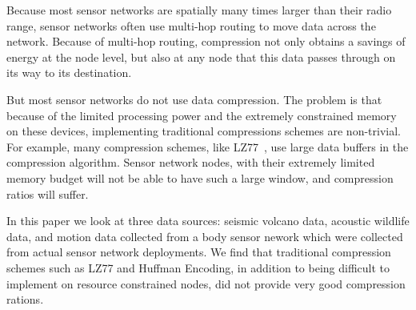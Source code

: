 Because most sensor networks are spatially many times larger than
their radio range, sensor networks often use multi-hop routing to move
data across the network.  Because of multi-hop routing, compression
not only obtains a savings of energy at the node level, but also at
any node that this data passes through on its way to its destination.

But most sensor networks do not use data compression.  The problem is
that because of the limited processing power and the extremely
constrained memory on these devices, implementing traditional
compressions schemes are non-trivial.  For example, many compression
schemes, like LZ77~\cite{lz77}, use large data buffers in the
compression algorithm.  Sensor network nodes, with their extremely
limited memory budget will not be able to have such a large window,
and compression ratios will suffer.

In this paper we look at three data sources: seismic volcano data,
acoustic wildlife data, and motion data collected from a body sensor
nework which were collected from actual sensor network deployments.
We find that traditional compression schemes such as LZ77 and Huffman
Encoding, in addition to being difficult to implement on resource
constrained nodes, did not provide very good compression rations.  




